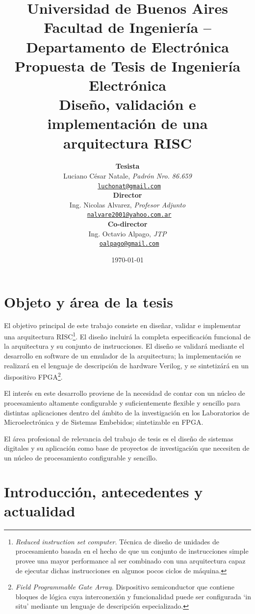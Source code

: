 \documentclass[a4paper]{article}
\title{
	{\normalsize
		Universidad de Buenos Aires\\
		Facultad de Ingeniería -- Departamento de Electrónica\\
		Propuesta de Tesis de Ingeniería Electrónica\\
		\vspace{0.7cm}
	}
	Diseño, validación e implementación de una arquitectura RISC
}
\author{	\textbf{Tesista}															\\
			Luciano César Natale, \textit{Padrón Nro. 86.659}               			\\
            \texttt{ \href{mailto:luchonat@gmail.com}{luchonat@gmail.com}}			\\[2.5ex]
            \textbf{Director}																\\
            Ing. Nicolas Alvarez, \textit{Profesor Adjunto}             				\\
            \texttt{ \href{mailto:nalvare2001@yahoo.com.ar}{nalvare2001@yahoo.com.ar}}  \\[2.5ex]
            \textbf{Co-director}															\\
            Ing. Octavio Alpago, \textit{JTP}               					\\
            \texttt{ \href{mailto:oalpago@gmail.com}{oalpago@gmail.com}}                \\[2.5ex]
       }
\date{\today}
\begin{document}
\maketitle



\thispagestyle{fancy}

\section{Objeto y área de la tesis}

El objetivo principal de este trabajo consiste en diseñar, validar e implementar una arquitectura RISC\footnote{\label{RISC} \emph{Reduced instruction set computer}. Técnica de diseño de unidades de procesamiento basada en el hecho de que un conjunto de instrucciones simple provee una mayor performance al ser combinado con una arquitectura capaz de ejecutar dichas instrucciones en algunos pocos ciclos de máquina.}. El diseño incluirá la completa especificación funcional de la arquitectura y su conjunto de instrucciones. El diseño se validará mediante el desarrollo en software de un emulador de la arquitectura; la implementación se realizará en el lenguaje de descripción de hardware Verilog, y se sintetizárá en un dispositivo FPGA\footnote{\label{FPGA} \emph{Field Programmable Gate Array}. Dispositivo semiconductor que contiene bloques de lógica cuya interconexión y funcionalidad puede ser configurada `in situ' mediante un lenguaje de descripción especializado.}.

El interés en este desarrollo proviene de la necesidad de contar con un núcleo de procesamiento altamente configurable y suficientemente flexible y sencillo para distintas aplicaciones dentro del ámbito de la investigación en los Laboratorios de Microelectrónica y de Sistemas Embebidos; sintetizable en FPGA.

El área profesional de relevancia del trabajo de tesis es el diseño de sistemas digitales y su aplicación como base de proyectos de investigación que necesiten de un núcleo de procesamiento configurable y sencillo.

\newpage

\section{Introducción, antecedentes y actualidad}
\end{document}
